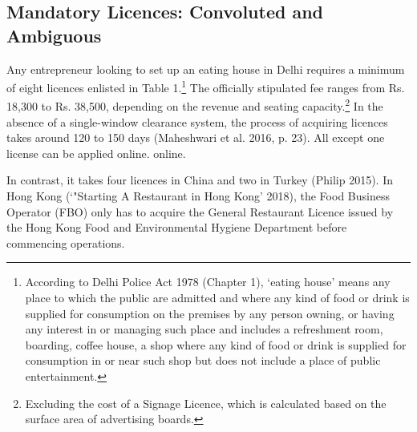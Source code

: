 \documentclass[a4paper, 12pt]{article}
\begin{document}
                    \subsection{Mandatory Licences: Convoluted and Ambiguous}
                     Any entrepreneur looking to set up an eating house in Delhi requires a minimum of eight licences enlisted in Table 1.\footnote{According to Delhi Police Act 1978 (Chapter 1), ‘eating house’ means any place to which the public are admitted and where 
any kind of food or drink is supplied for consumption on the premises by any person owning, or having any interest in or managing such place and includes a refreshment room, boarding, coffee house, a shop where any kind of food or drink is supplied for 
consumption in or near such shop but does not include a place of public entertainment.} The officially stipulated fee ranges from Rs. 18,300 to Rs. 38,500, depending on the revenue and seating capacity.\footnote{Excluding the cost of a Signage Licence, which is 
calculated based on the surface area of advertising boards.} In the absence of a single-window clearance system, the process of acquiring licences takes around 120 to 150 days (Maheshwari et al. 2016, p. 23). All except one license can be applied online. 
online.
     
                   In contrast, it takes four licences in China and two in Turkey (Philip 2015). In Hong Kong (‘"Starting A Restaurant in Hong Kong’ 2018), the Food Business Operator (FBO) only has to acquire the General Restaurant Licence issued by the Hong Kong 
Food and Environmental Hygiene Department before commencing operations.

 
\end{document}
